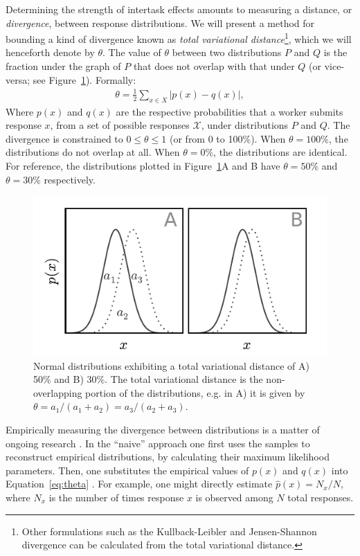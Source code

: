 \documentclass{sigchi}
\begin{document}
Determining the strength of intertask effects amounts to measuring a 
distance, or \textit{divergence}, between response distributions.
We will present a method for bounding a kind of divergence known as 
\textit{total variational distance}\footnote{
  Other formulations such as the Kullback-Leibler and 
  Jensen-Shannon divergence can be calculated from the total variational
  distance.
}, which we will henceforth denote by $\theta$.
The value of $\theta$ between two distributions $P$ and $Q$ 
is the fraction under the graph of $P$ that does not overlap with that
under $Q$ (or vice-versa; see Figure~\ref{fig:l1_example}).  
Formally:
\begin{align}
	\theta = \frac{1}{2}\sum_{x \in X} \left| p(x) - q(x) \right|,
	\label{eq:theta}
\end{align}
Where $p(x)$ and $q(x)$ are the respective probabilities 
that a worker submits response $x$, from a set of possible responses 
$\mathcal{X}$, under distributions $P$ and $Q$.
The divergence is constrained to 
$0 \leq \theta \leq 1$ (or from 0 to 100\%).
When $\theta = 100\%$, the distributions do not overlap at all.  
When $\theta = 0\%$, the distributions are identical.
For reference, the distributions plotted in 
Figure~\ref{fig:l1_example}A and B have $\theta=50\%$ and $\theta=30\%$ 
respectively.

\begin{figure}
	\centering
	\includegraphics[scale=1.0]{figs/normal_example.pdf}
	\caption{
	  	Normal distributions exhibiting a total variational distance
		of A) 50\% and B) 30\%.  The total variational distance is 
		the non-overlapping portion of the distributions, e.g. in
		A) it is given by 
		$\theta = a_1 / (a_1 + a_2) = a_3 / (a_2 + a_3)$.
	}
	\label{fig:l1_example}
\end{figure}

Empirically measuring the divergence between distributions
is a matter of ongoing
research \cite{val-thesis,batu2013testing,chan2014optimal}.
In the ``naive'' approach one first uses the samples to reconstruct 
empirical
distributions, by calculating their maximum likelihood parameters.
Then, one substitutes the empirical values of $p(x)$ and $q(x)$ into 
Equation~\ref{eq:theta} \cite{batu2013testing}.  
For example, one might directly estimate $\hat{p}(x) = N_x/N$, 
where $N_x$ is the number of times response $x$ is observed among $N$ 
total responses.
\end{document}
